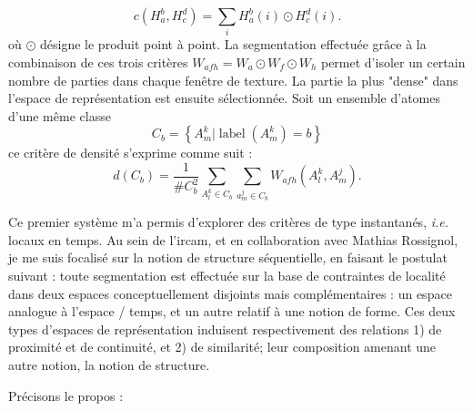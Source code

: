 \begin{equation}
  { c \left( H _ { a } ^ { b } , H _ { c } ^ { d } \right) = \sum _ { i } H _ { a } ^ { b } ( i ) \odot H _ { c } ^ { d } ( i ) }.
\end{equation}
où $\odot$ désigne le produit point à point.
La segmentation effectuée grâce à la combinaison de ces trois critères $W_ { a f h } = W_a \odot W_f \odot W_h$ permet d'isoler un certain nombre de parties dans chaque fenêtre de texture. La partie la plus "dense" dans l'espace de représentation est ensuite sélectionnée. Soit un ensemble d'atomes d'une même classe
$$C _ { b } = \left\{ A _ { m } ^ { k } | \operatorname { label } \left( A _ { m } ^ { k } \right) = b \right\}$$
ce critère de densité s'exprime comme suit :
\begin{equation}
  d \left( C _ { b } \right) = \frac { 1 } { \# C _ { b } ^ { 2 } } \sum _ { A _ { l } ^ { k } \in C _ { b } } \sum _ { a _ { m } ^ { j } \in C _ { b } } W _ { a f h } \left( A _ { l } ^ { k } , A _ { m } ^ { j } \right).
\end{equation}




Ce premier système m'a permis d'explorer des critères de type instantanés, \textit{i.e.} locaux en temps. Au sein de l'ircam, et en collaboration avec Mathias Rossignol, je me suis focalisé sur la notion de structure séquentielle, en faisant le postulat suivant : toute segmentation est effectuée sur la base de contraintes de localité dans deux espaces conceptuellement disjoints mais complémentaires : un espace analogue à l'espace / temps, et un autre relatif à une notion de forme. Ces deux types d'espaces de représentation induisent respectivement des relations 1) de proximité et de continuité, et 2) de similarité; leur composition amenant une autre notion, la notion de structure.

Précisons le propos : %

